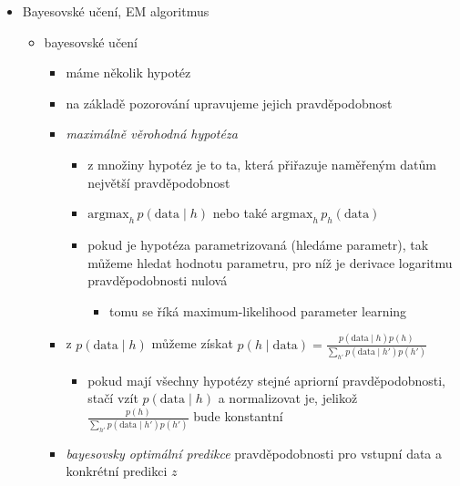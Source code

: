 \begin{itemize}
\begin{itemize}
\begin{itemize}
\item pokud lze třídy oddělit nadrovinou, zvolí takovou, která je nejdál od všech dat (příkladů)
\item nadrovina \dots{} maximum margin separator
\item pokud nejde použít nadrovinu, provede mapování do vícedimenzionálního prostoru (pomocí kernel function), kde už příklady půjde oddělit
\item SVMs jsou neparametrická metoda - příklady blíže k separátoru jsou důležitější, říká se jim support vectors (vlastně definují ten separátor)
\end{itemize}
\end{itemize}
\item Bayesovské učení, EM algoritmus
\begin{itemize}
\item bayesovské učení
\begin{itemize}
\item máme několik hypotéz
\item na základě pozorování upravujeme jejich pravděpodobnost
\item \textit{maximálně věrohodná hypotéza}
\begin{itemize}
\item z množiny hypotéz je to ta, která přiřazuje naměřeným datům největší pravděpodobnost
\item $\mathrm{argmax}_h\,p(\mathrm{data}\mid h)$ nebo také $\mathrm{argmax}_h\,p_h(\mathrm{data})$
\item pokud je hypotéza parametrizovaná (hledáme parametr), tak můžeme hledat hodnotu parametru, pro níž je derivace logaritmu pravděpodobnosti nulová
\begin{itemize}
\item tomu se říká maximum-likelihood parameter learning
\end{itemize}
\end{itemize}
\item z $p(\mathrm{data}\mid h)$ můžeme získat $p(h\mid\mathrm{data})=\frac{p(\mathrm{data}\mid h)p(h)}{\sum_{h'} p(\mathrm{data}\mid h')p(h')}$
\begin{itemize}
\item pokud mají všechny hypotézy stejné apriorní pravděpodobnosti, stačí vzít $p(\mathrm{data}\mid h)$ a normalizovat je, jelikož $\frac{p(h)}{\sum_{h'} p(\mathrm{data}\mid h')p(h')}$ bude konstantní
\end{itemize}
\item \textit{bayesovsky optimální predikce} pravděpodobnosti pro vstupní data a konkrétní predikci $z$

\end{itemize}
\end{itemize}
\end{itemize}
